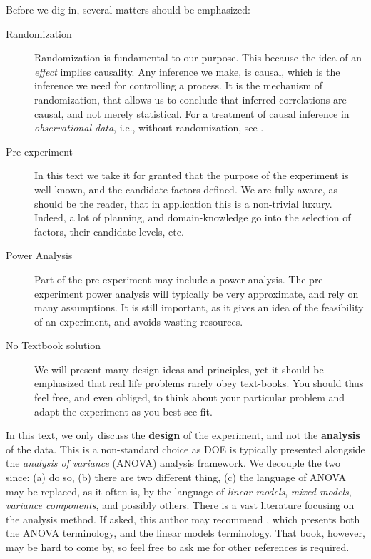 Before we dig in, several matters should be emphasized:
\begin{description}
\item [Randomization] Randomization is fundamental to our purpose. This because the idea of an \emph{effect} implies causality. Any inference we make, is causal, which is the inference we need for controlling a process.
It is the mechanism of randomization, that allows us to conclude that inferred correlations are causal, and not merely statistical.
For a treatment of causal inference in \emph{observational data}, i.e., without randomization, see \cite{rosenbaum_observational_2002}.

\item [Pre-experiment] In this text we take it for granted that the purpose of the experiment is well known, and the candidate factors defined. We are fully aware, as should be the reader, that in application this is a non-trivial luxury. Indeed, a lot of planning, and domain-knowledge go into the selection of factors, their candidate levels, etc.

\item [Power Analysis] Part of the pre-experiment may include a power analysis. The pre-experiment power analysis will typically be very approximate, and rely on many assumptions. It is still important, as it gives an idea of the feasibility of an experiment, and avoids wasting resources.

\item [No Textbook solution] We will present many design ideas and principles, yet it should be emphasized that real life problems rarely obey text-books. You should thus feel free, and even obliged, to think about your particular problem and adapt the experiment as you best see fit. 
\end{description}



\begin{remark}
In this text, we only discuss the \textbf{design} of the experiment, and not the \textbf{analysis} of the data.
This is a non-standard choice as DOE is typically presented alongside the \emph{analysis of variance} (ANOVA) analysis framework.
We decouple the two since: 
(a) \cite{cox_theory_2000} do so, 
(b) there are two different thing, 
(c) the language of ANOVA may be replaced, as it often is, by the language of \emph{linear models}, \emph{mixed models}, \emph{variance components}, and possibly others. 
There is a vast literature focusing on the analysis method. 
If asked, this author may recommend \cite{hocking_analysis_1985}, which presents both the ANOVA terminology, and the linear models terminology.
That book, however, may be hard to come by, so feel free to ask me for other references is required.
\end{remark}





